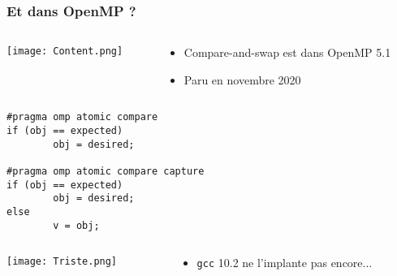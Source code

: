 \documentclass[xcolor={x11names,svgnames},x11names,svgnames]{beamer}
\begin{document}

\begin{frame}[fragile]
  \frametitle{Et dans OpenMP ?}

  \begin{columns}[b]
    \begin{column}{.1\textwidth}
      \texttt{[image: Content.png]}
    \end{column}
    \begin{column}{.9\textwidth}
      \begin{itemize}
      \item Compare-and-swap est dans OpenMP 5.1
      \item Paru en novembre 2020
      \end{itemize}
    \end{column}
  \end{columns}

\bigskip
  
\begin{verbatim}
#pragma omp atomic compare
if (obj == expected)
        obj = desired;

#pragma omp atomic compare capture
if (obj == expected)
        obj = desired;
else
        v = obj;
\end{verbatim} 

\bigskip

\begin{columns}[b]
    \begin{column}{.1\textwidth}
      \texttt{[image: Triste.png]}
    \end{column}
    \begin{column}{.9\textwidth}
      \begin{itemize}
      \item \texttt{gcc} 10.2 ne l'implante pas encore...
      \end{itemize}
    \end{column}
  \end{columns}

\end{frame}

\end{document}
